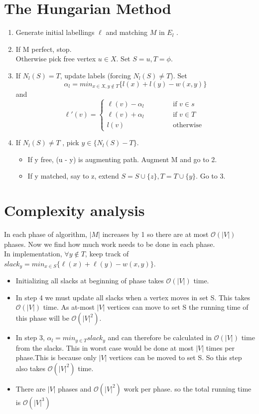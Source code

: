 \documentclass[a4paper]{report}
\theoremstyle{definition}
\begin{document}
\section{The Hungarian Method}
\begin{enumerate}
\item Generate initial labellings $\ell$ and matching $M$ in $E_l$ .
\item If M perfect, stop.\\
Otherwise pick free vertex $u \in X$.
Set $S = {u}, T = \phi$.
\item If $N_l (S) = T$, update labels (forcing $N_l (S) \neq T $).
Set $$\alpha_l =min_{x\in X,y \notin T} \{l(x) + l(y) - w(x, y)\}$$ and
\begin{equation*}
\ell'(v)=
\left\{ \begin{array}{ll}
\ell(v)-\alpha_l  \qquad \quad   & \mbox{ if } v\in s\\
\ell(v)+\alpha_l    &  \mbox{ if }v\in T\\
l(v)              &  \mbox{ otherwise }
\end{array}\right.
\end{equation*}
\item If $N_l (S) \neq T$ , pick $y \in \{N_l (S) - T\} $.
\begin{itemize}
\item If y free, (u - y) is augmenting path.
Augment M and go to 2.
\item If y matched, say to z, extend $S = S \cup \{z\}, T = T \cup \{y\}.$ Go to 3.
\end{itemize}
\end{enumerate}

\section{Complexity analysis}

In each phase of algorithm, $|M |$ increases by 1 so
there are at most $\mathcal{O}(|V|)$ phases. Now we find how much work needs to be done in each phase.\\
In implementation, $\forall y \notin T$, keep track of
$slack_y = min_{x\in S} \{\ell(x) + \ell(y) - w(x, y)\}.$\\
\begin{itemize}
\item Initializing all slacks at beginning of phase takes
 $\mathcal{O}(|V|)$ time.
\item In step 4 we must update all slacks when a vertex moves in set S. This takes  $\mathcal{O}(|V|)$ time. As at-most $|V|$ vertices can move to set S the running time of this phase will be $\mathcal{O}(|V|^2)$.
\item In step 3, $\alpha_l = min_{y\in T} slack_y$ and can therefore be calculated in $\mathcal{O}(|V|)$ time from the slacks. This in worst case would be done at most $|V |$ times per phase.This is because only $|V|$ vertices can be moved to set S. So this step also takes $\mathcal{O}(|V|^2)$ time.
\item There are $|V |$ phases and $\mathcal{O}(|V |^2 )$ work per phase. so the total running time is $\mathcal{O}(|V |^3 )$
\end{itemize}
\end{document}
